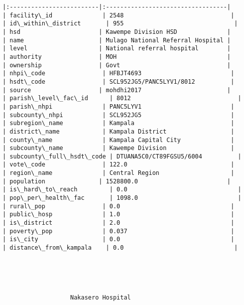 \documentclass[11pt]{article}
\begin{document}
\begin{Verbatim}[commandchars=\\\{\}]
|:-------------------------|:----------------------------------|
| facility\_id              | 2548                              |
| id\_within\_district       | 955                               |
| hsd                      | Kawempe Division HSD              |
| name                     | Mulago National Referral Hospital |
| level                    | National referral hospital        |
| authority                | MOH                               |
| ownership                | Govt                              |
| nhpi\_code                | HFBJT4693                         |
| hsdt\_code                | SCL952JG5/PANC5LYV1/8012          |
| source                   | mohdhi2017                        |
| parish\_level\_fac\_id      | 8012                              |
| parish\_nhpi              | PANC5LYV1                         |
| subcounty\_nhpi           | SCL952JG5                         |
| subregion\_name           | Kampala                           |
| district\_name            | Kampala District                  |
| county\_name              | Kampala Capital City              |
| subcounty\_name           | Kawempe Division                  |
| subcounty\_full\_hsdt\_code | DTUANA5C0/CT89FGSU5/6004          |
| vote\_code                | 122.0                             |
| region\_name              | Central Region                    |
| population               | 1528800.0                         |
| is\_hard\_to\_reach         | 0.0                               |
| pop\_per\_health\_fac       | 1098.0                            |
| rural\_pop                | 0.0                               |
| public\_hosp              | 1.0                               |
| is\_district              | 2.0                               |
| poverty\_pop              | 0.037                             |
| is\_city                  | 0.0                               |
| distance\_from\_kampala    | 0.0                               |





                   Nakasero Hospital                    


\end{Verbatim}
\end{document}
